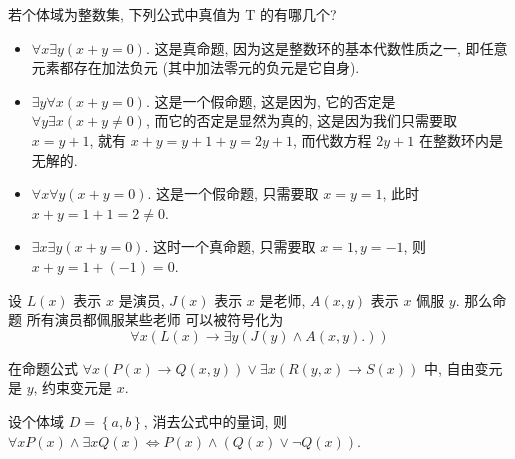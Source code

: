 \documentclass[10pt,UTF8]{ctexbook} %
\begin{document}
\begin{exercise}
    若个体域为整数集, 下列公式中真值为 T 的有哪几个?
    \begin{itemize}[itemsep=0pt]
        \item $\forall x \exists y (x+y = 0)$. 这是真命题,
        因为这是整数环的基本代数性质之一, 即{\kaishu 任意元素都存在加法负元} (其中加法零元的负元是它自身).
        \item $\exists y \forall x \left( x+y = 0 \right)$.
        这是一个假命题, 这是因为, 它的否定是 $\forall y \exists x \left( x+y \ne 0 \right)$,
        而它的否定是显然为真的, 这是因为我们只需要取 $x = y+1$, 就有
        $x+y = y+1+y = 2y+1$, 而代数方程 $2y+1$ 在整数环内是无解的.
        \item $\forall x \forall y \left( x+y = 0 \right)$.
        这是一个假命题, 只需要取 $x=y=1$, 此时 $x+y = 1+1=2 \ne 0$.
        \item $\exists x \exists y \left( x+y = 0 \right)$.
        这时一个真命题, 只需要取 $x = 1, y = -1$, 则 $x+y = 1+(-1) = 0$.
    \end{itemize}
\end{exercise}

\begin{exercise}
    设 $L(x)$ 表示 $x$ 是演员, $J(x)$ 表示 $x$ 是老师, $A(x,y)$ 表示 $x$ 佩服 $y$.
    那么命题 {\kaishu 所有演员都佩服某些老师} 可以被符号化为
    \[ \forall x \left( L(x) \to \exists y \left(
        J(y) \wedge A(x,y).
    \right) \right) \]
\end{exercise}

\begin{exercise}
    在命题公式 $\forall x \left(
        P(x) \to Q(x,y)
    \right) \vee \exists x \left(
        R(y,x) \to S(x)
    \right)$ 中, 自由变元是 $y$, 约束变元是 $x$.
\end{exercise}

\begin{exercise}
    设个体域 $D = \left\{a,b\right\}$, 消去公式中的量词,
    则 $\forall x P(x) \wedge \exists x Q(x) \iff P(x) \wedge \left(
        Q(x) \vee \lnot Q(x)
    \right)$.
\end{exercise}
\end{document}
